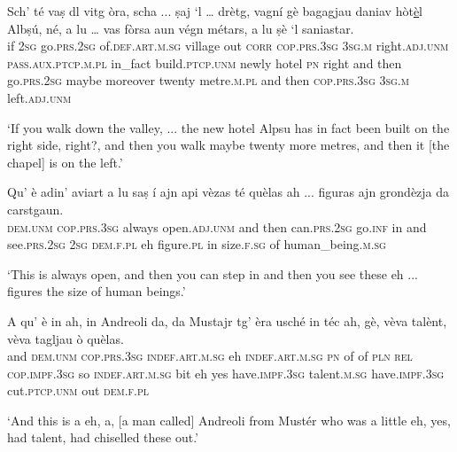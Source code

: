 \begin{linenumbers}
\gll  Sch’ té vaṣ dl vitg òra, scha ... ṣaj `l … drètg, vagní\footnotemark{} gè bagagjau daniav hòt\underline {è}l Albṣú, né, a lu … vas fòrsa aun végn métars, a lu ṣè `l\footnotemark{} saniastar.\\
if \textsc{2sg} go.\textsc{prs.2sg} of.\textsc{def.art.m.sg} village out \textsc{corr} {} \textsc{cop.prs.3sg} \textsc{3sg.m} {} right.\textsc{adj.unm} \textsc{pass.aux.ptcp.m.pl} in\_fact build.\textsc{ptcp.unm} newly hotel \textsc{pn} right and then {} go.\textsc{prs.2sg} maybe moreover twenty metre.\textsc{m.pl} and then \textsc{cop.prs.3sg} \textsc{3sg.m} left.\textsc{adj.unm}\\
\end{linenumbers}
\medskip
\glt `If you walk down the valley, ... the new hotel Alpsu has in fact been built on the right side, right?, and then you walk maybe twenty more metres, and then it [the chapel] is on the left.'

\medskip

\begin{linenumbers}
\gll  Qu’ è adin' aviart a lu saṣ í ajn api vèzas té quèlas ah ... figuras ajn grondèzja da carstgaun.\\
 \textsc{dem.unm} \textsc{cop.prs.3sg} always open.\textsc{adj.unm} and then can.\textsc{prs.2sg} go.\textsc{inf} in and see.\textsc{prs.2sg} \textsc{2sg} \textsc{dem.f.pl} eh {} figure.\textsc{pl} in size.\textsc{f.sg} of human\_being.\textsc{m.sg} \\
\end{linenumbers}
\medskip
\glt `This is always open, and then you can step in and then you see these eh ... figures the size of human beings.'
\medskip

\begin{linenumbers}
\gll   A qu’ è in ah, in  Andreoli da, da Mustajr tg’ èra usché in téc ah, gè, vèva talènt, vèva tagljau ò quèlas. \\
and \textsc{dem.unm} \textsc{cop.prs.3sg} \textsc{indef.art.m.sg} eh \textsc{indef.art.m.sg} \textsc{pn} of of \textsc{pln} \textsc{rel} \textsc{cop.impf.3sg} so \textsc{indef.art.m.sg} bit eh yes have.\textsc{impf.3sg} talent.\textsc{m.sg} have.\textsc{impf.3sg} cut.\textsc{ptcp.unm} out \textsc{dem.f.pl}\\
\end{linenumbers}
\medskip
\glt `And this is a eh, a, [a man called] Andreoli from Mustér who was a little eh, yes, had talent, had chiselled these out.'
\medskip

